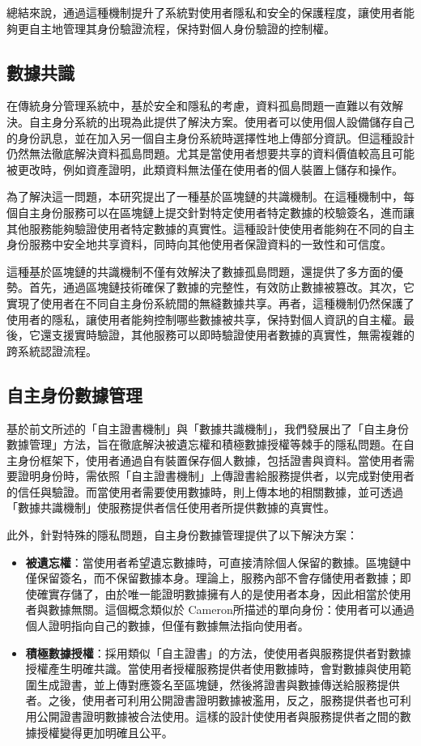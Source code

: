 總結來說，通過這種機制提升了系統對使用者隱私和安全的保護程度，讓使用者能夠更自主地管理其身份驗證流程，保持對個人身份驗證的控制權。
\subsection{數據共識}
在傳統身分管理系統中，基於安全和隱私的考慮，資料孤島問題一直難以有效解決。自主身分系統的出現為此提供了解決方案。使用者可以使用個人設備儲存自己的身份訊息，並在加入另一個自主身份系統時選擇性地上傳部分資訊。但這種設計仍然無法徹底解決資料孤島問題。尤其是當使用者想要共享的資料價值較高且可能被更改時，例如資產證明，此類資料無法僅在使用者的個人裝置上儲存和操作。

為了解決這一問題，本研究提出了一種基於區塊鏈的共識機制。在這種機制中，每個自主身份服務可以在區塊鏈上提交針對特定使用者特定數據的校驗簽名，進而讓其他服務能夠驗證使用者特定數據的真實性。這種設計使使用者能夠在不同的自主身份服務中安全地共享資料，同時向其他使用者保證資料的一致性和可信度。

這種基於區塊鏈的共識機制不僅有效解決了數據孤島問題，還提供了多方面的優勢。首先，通過區塊鏈技術確保了數據的完整性，有效防止數據被篡改。其次，它實現了使用者在不同自主身份系統間的無縫數據共享。再者，這種機制仍然保護了使用者的隱私，讓使用者能夠控制哪些數據被共享，保持對個人資訊的自主權。最後，它還支援實時驗證，其他服務可以即時驗證使用者數據的真實性，無需複雜的跨系統認證流程。
\subsection{自主身份數據管理}
基於前文所述的「自主證書機制」與「數據共識機制」，我們發展出了「自主身份數據管理」方法，旨在徹底解決被遺忘權和積極數據授權等棘手的隱私問題。在自主身份框架下，使用者通過自有裝置保存個人數據，包括證書與資料。當使用者需要證明身份時，需依照「自主證書機制」上傳證書給服務提供者，以完成對使用者的信任與驗證。而當使用者需要使用數據時，則上傳本地的相關數據，並可透過「數據共識機制」使服務提供者信任使用者所提供數據的真實性。

此外，針對特殊的隱私問題，自主身份數據管理提供了以下解決方案：
\begin{itemize}
  \item \textbf{被遺忘權}：當使用者希望遺忘數據時，可直接清除個人保留的數據。區塊鏈中僅保留簽名，而不保留數據本身。理論上，服務內部不會存儲使用者數據；即使確實存儲了，由於唯一能證明數據擁有人的是使用者本身，因此相當於使用者與數據無關。這個概念類似於 Cameron\cite{cameron2005laws}所描述的單向身份：使用者可以通過個人證明指向自己的數據，但僅有數據無法指向使用者。
  \item \textbf{積極數據授權}：採用類似「自主證書」的方法，使使用者與服務提供者對數據授權產生明確共識。當使用者授權服務提供者使用數據時，會對數據與使用範圍生成證書，並上傳對應簽名至區塊鏈，然後將證書與數據傳送給服務提供者。之後，使用者可利用公開證書證明數據被濫用，反之，服務提供者也可利用公開證書證明數據被合法使用。這樣的設計使使用者與服務提供者之間的數據授權變得更加明確且公平。
\end{itemize}

